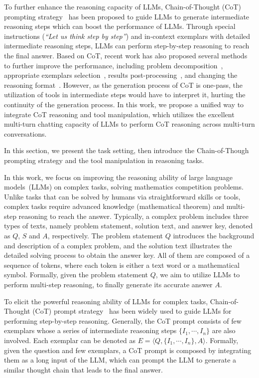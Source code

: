 To further enhance the reasoning capacity of LLMs, Chain-of-Thought (CoT) prompting strategy~\cite{CoT,zero-shot-cot} has been proposed to guide LLMs to generate intermediate reasoning steps which can boost the performance of LLMs.
Through special instructions (\eg \emph{``Let us think step by step''}) and in-context exemplars with detailed intermediate reasoning steps, LLMs can perform step-by-step reasoning to reach the final answer.
Based on CoT, recent work has also proposed several methods to further improve the performance, including problem decomposition~\cite{Least-to-Most, Sccessive-Prompting}, appropriate exemplars selection~\cite{ye2022Complementary, Shi2023Large}, results post-processing~\cite{self-consistency, self-refine, PHP}, and changing the reasoning format~\cite{tree-of-thought, mathchat}.
However, as the generation process of CoT is one-pass, the utilization of tools in intermediate steps would have to interpret it, hurting the continuity of the generation process.
In this work, we propose a unified way to integrate CoT reasoning and tool manipulation, which utilizes the excellent multi-turn chatting capacity of LLMs to perform CoT reasoning across multi-turn conversations.

In this section, we present the task setting, then introduce the Chain-of-Though prompting strategy and the tool manipulation in reasoning tasks.

In this work, we focus on improving the reasoning ability of large language models~(LLMs) on complex tasks, \eg solving mathematics competition problems.
Unlike tasks that can be solved by humans via straightforward skills or tools, complex tasks require advanced knowledge (\eg mathematical theorem) and multi-step reasoning to reach the answer.
Typically, a complex problem includes three types of texts, namely problem statement, solution text, and answer key, denoted as $Q$, $S$ and $A$, respectively.
The problem statement $Q$ introduces the background and description of a complex problem, and the solution text illustrates the detailed solving process to obtain the answer key.
All of them are composed of a sequence of tokens, where each token is either a text word or a mathematical symbol.
Formally, given the problem statement $Q$, we aim to utilize LLMs to perform multi-step reasoning, to finally generate its accurate answer $A$.

To elicit the powerful reasoning ability of LLMs for complex tasks, Chain-of-Thought (CoT) prompt strategy~\cite{CoT} has been widely used to guide LLMs for performing step-by-step reasoning.
Generally, the CoT prompt consists of few exemplars whose a series of intermediate reasoning steps $\{I_1, \cdots, I_n \}$ are also involved.
Each exemplar can be denoted as $E=\langle Q, \{ I_1, \cdots, I_n \}, A \rangle$.
Formally, given the question and few exemplars, a CoT prompt is composed by integrating them as a long input of the LLM, which can prompt the LLM to generate a similar thought chain that leads to the final answer.

